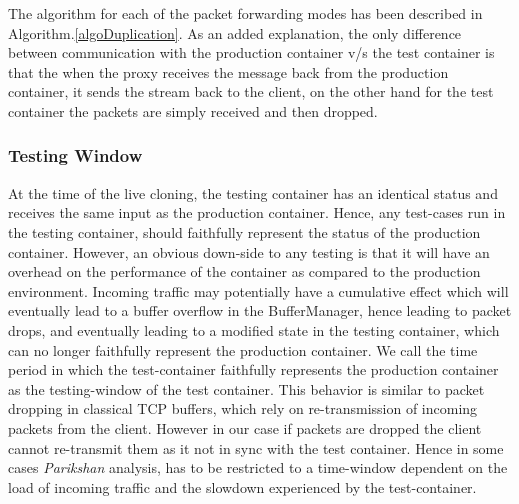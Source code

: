 The algorithm for each of the packet forwarding modes has been described in Algorithm.\ref{algoDuplication}. 
As an added explanation, the only difference between communication with the production container v/s the test container is that the when the proxy receives the message back from the production container, it sends the stream back to the client, on the other hand for the test container the packets are simply received and then dropped.

\subsubsection{Testing Window}
\label{sec:testingWindow}

At the time of the live cloning, the testing container has an identical status and receives the same input as the production container. 
Hence, any test-cases run in the testing container, should faithfully represent the status of the production container.
However, an obvious down-side to any testing is that it will have an overhead on the performance of the container as compared to the production environment.
Incoming traffic may potentially have a cumulative effect which will eventually lead to a buffer overflow in the BufferManager, hence leading to packet drops, and eventually leading to a modified state in the testing container, which can no longer faithfully represent the production container.
We call the time period in which the test-container faithfully represents the production container as the testing-window of the test container. 
This behavior is similar to packet dropping in classical TCP buffers, which rely on re-transmission of incoming packets from the client.
However in our case if packets are dropped the client cannot re-transmit them as it not in sync with the test container.
Hence in some cases \textit{Parikshan} analysis, has to be restricted to a time-window dependent on the load of incoming traffic and the slowdown experienced by the test-container.

